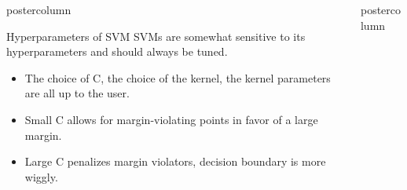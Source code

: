 \documentclass{beamer}
\newlength{\columnheight} %
\begin{document}
\begin{frame}[fragile]{}
\begin{columns}
\begin{column}{.31\textwidth}
\begin{beamercolorbox}[center]{postercolumn}
\begin{minipage}{.98\textwidth}
{\begin{myblock}{Hyperparameters of SVM}
    SVMs are somewhat sensitive to its hyperparameters and should always be tuned.\\

    \begin{itemize}[$\bullet$]
    \setlength{\itemindent}{+.3in}
      \item The choice of C, the choice of the kernel, the kernel parameters are all up to the user.
\item Small C allows for margin-violating points in favor of a large margin.
\item Large C penalizes margin violators, decision boundary is more wiggly.
    \end{itemize}

\end{myblock}
}
\end{minipage}
\end{beamercolorbox}
\end{column}


\begin{column}{.31\textwidth}
\begin{beamercolorbox}[center]{postercolumn}
\begin{minipage}{.98\textwidth}
\parbox[t][\columnheight]{\textwidth}{

  \begin{myblock}{}

\end{myblock}
  }
  
  \end{minipage}
  \end{beamercolorbox}
  \end{column}
  
  
  
\end{columns}
\end{frame}
\end{document}
